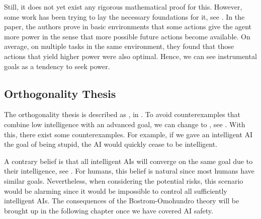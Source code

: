 \documentclass[12pt,A4]{report}
\theoremstyle{definition}
\begin{document}

Still, it does not yet exist any rigorous mathematical proof for this. However, some work has been trying to lay the necessary foundations for it, see \citet{Turner19a}. In the paper, the authors prove in basic environments that some actions give the agent more power in the sense that more possible future actions become available. On average, on multiple tasks in the same environment, they found that those actions that yield higher power were also optimal. Hence, we can see instrumental goals as a tendency to seek power.


\subsection{Orthogonality Thesis}
The orthogonality thesis is described as , in \citet{Bostrom12}. To avoid counterexamples that combine low intelligence with an advanced goal, we can change  to , see \citet{Haggstrom19}. With this, there exist some counterexamples. For example, if we gave an intelligent AI the goal of being stupid, the AI would quickly cease to be intelligent.

A contrary belief is that all intelligent AIs will converge on the same goal due to their intelligence, see \citet{MullerCannon}. For humans, this belief is natural since most humans have similar goals. Nevertheless, when considering the potential risks, this scenario would be alarming since it would be impossible to control all sufficiently intelligent AIs. The consequences of the Bostrom-Omohundro theory will be brought up in the following chapter once we have covered AI safety.

\end{document}
